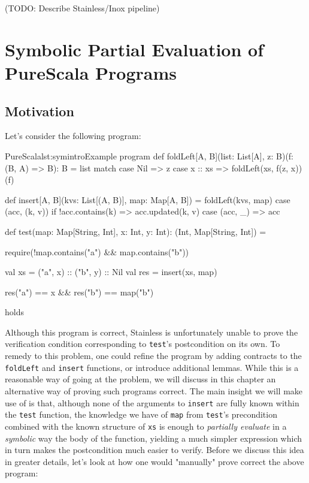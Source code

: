\documentclass[a4paper,twoside]{article}
\newcommand{\TODO}[1]{\textcolor{YellowOrange}{(TODO: #1)}} %
\newcommand{\stt}[1]{\texttt{\small{#1}}}
\begin{document}
\TODO{Describe Stainless/Inox pipeline}

\clearpage
\section{Symbolic Partial Evaluation of PureScala Programs}
\label{symbolic}

\subsection{Motivation}
\label{symbolic-motivation}

Let's consider the following program:

\begin{Code}{PureScala}{lst:symintro}{Example program}
def foldLeft[A, B](list: List[A], z: B)(f: (B, A) => B): B = list match {
  case Nil     => z
  case x :: xs => foldLeft(xs, f(z, x))(f)
}

def insert[A, B](kvs: List[(A, B)], map: Map[A, B]) = {
  foldLeft(kvs, map) {
    case (acc, (k, v)) if !acc.contains(k) => acc.updated(k, v)
    case (acc, _)                          => acc
  }
}

def test(map: Map[String, Int], x: Int, y: Int): (Int, Map[String, Int]) = {
  require(!map.contains("a") && map.contains("b"))

  val xs  = ("a", x) :: ("b", y) :: Nil
  val res = insert(xs, map)

  res("a") == x && res("b") == map("b")
} holds
\end{Code}

Although this program is correct, Stainless is unfortunately unable to prove the verification condition corresponding to \stt{test}'s postcondition on its own. To remedy to this problem, one could refine the program by adding contracts to the \stt{foldLeft} and \stt{insert} functions, or introduce additional lemmas. While this is a reasonable way of going at the problem, we will discuss in this chapter an alternative way of proving such programs correct. The main insight we will make use of is that, although none of the arguments to \stt{insert} are fully known within the \stt{test} function, the knowledge we have of \stt{map} from \stt{test}'s precondition combined with the known structure of \stt{xs} is enough to \textit{partially evaluate} in a \textit{symbolic} way the body of the function, yielding a much simpler expression which in turn makes the postcondition much easier to verify. Before we discuss this idea in greater details, let's look at how one would "manually" prove correct the above program:
\end{document}
